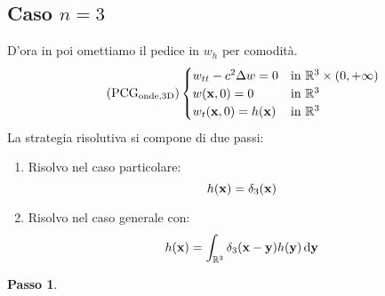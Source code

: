 \subsection{Caso \texorpdfstring{$n=3$}{n=3}}

D'ora in poi omettiamo il pedice in $\displaystyle w_{h}$ per comodità.
\begin{equation*}
    \tag{PCG$_{\text{onde,3D}}$}
    \begin{cases}
        w_{tt} -c^{2} \Delta w=0 & \text{in} \ \mathbb{R}^{3} \times (0,+\infty) \\
        w(\x ,0) =0              & \text{in} \ \mathbb{R}^{3}                    \\
        w_{t}(\x ,0) =h(\x)      & \text{in} \ \mathbb{R}^{3}
    \end{cases}
    \label{eq:pcg-onde-3d}
\end{equation*}
La strategia risolutiva si compone di due passi:
\begin{enumerate}
    \item Risolvo nel caso particolare:
          \begin{equation*}
              h(\mathbf{x}) =\delta _{3}(\mathbf{x})
          \end{equation*}
    \item Risolvo nel caso generale con:
          \begin{equation*}
              h(\mathbf{x}) =\int _{\mathbb{R}^{3}} \delta _{3}(\mathbf{x} -\mathbf{y}) h(\mathbf{y}) \,\mathrm d \mathbf{y}
          \end{equation*}
\end{enumerate}

\textbf{Passo 1}.

